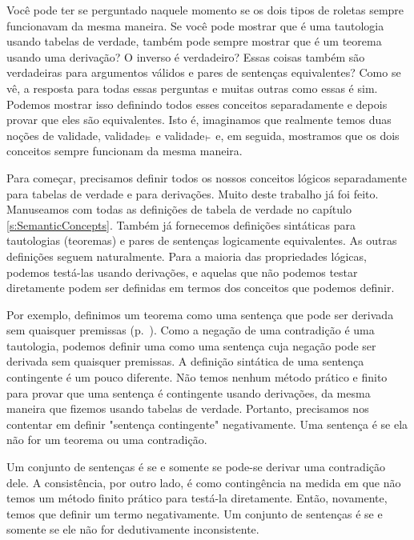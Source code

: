 Voc\^e pode ter se perguntado naquele momento se os dois tipos de roletas sempre funcionavam da mesma maneira. Se voc\^e pode mostrar que  \'e uma tautologia usando tabelas de verdade, tamb\'em pode sempre mostrar que \'e um teorema usando uma deriva\c c\~ao? O inverso \'e verdadeiro? Essas coisas tamb\'em s\~ao verdadeiras para argumentos v\'alidos e pares de senten\c cas equivalentes? Como se v\^e, a resposta para todas essas perguntas e muitas outras como essas \'e sim. Podemos mostrar isso definindo todos esses conceitos separadamente e depois provar que eles s\~ao equivalentes.  Isto \'e, imaginamos que realmente temos duas no\c c\~oes de validade, validade$_{\vDash}$ e validade$_{\vdash}$ e, em seguida, mostramos que os dois conceitos sempre funcionam da mesma maneira.


Para come\c car, precisamos definir todos os nossos conceitos l\'ogicos separadamente para tabelas de verdade e  para deriva\c c\~oes. Muito deste trabalho j\'a foi feito.  Manuseamos com todas as defini\c c\~oes de tabela de verdade no cap\'itulo \ref{s:SemanticConcepts}. Tamb\'em j\'a fornecemos defini\c c\~oes sint\'aticas para tautologias (teoremas) e pares de senten\c cas logicamente equivalentes. As outras defini\c c\~oes seguem naturalmente. Para a maioria das propriedades l\'ogicas, podemos test\'a-las usando deriva\c c\~oes, e aquelas que n\~ao podemos testar diretamente podem ser definidas em termos dos conceitos que podemos definir.

Por exemplo, definimos um teorema como uma senten\c ca que pode ser derivada sem quaisquer premissas (p.~\pageref{def:syntactic_tautology_in_sl}). Como a nega\c c\~ao de uma contradi\c c\~ao \'e uma tautologia, podemos definir uma  \label{def:syntactic_contradiction_in_sl} como uma senten\c ca cuja nega\c c\~ao pode ser derivada sem quaisquer premissas. A defini\c c\~ao sint\'atica de uma senten\c ca contingente \'e um pouco diferente. N\~ao temos nenhum m\'etodo pr\'atico e finito para provar que uma senten\c ca \'e contingente usando deriva\c c\~oes, da mesma maneira que fizemos usando tabelas de verdade. Portanto, precisamos nos contentar em definir "senten\c ca contingente" negativamente. Uma senten\c ca \'e  \label{def:syntactically_contingent_in_sl} se ela  n\~ao for um teorema ou uma contradi\c c\~ao. 
 

Um  conjunto de senten\c cas \'e  \label{def:syntactically_inconsistent_ in_sl}  se e somente se pode-se derivar uma contradi\c c\~ao dele. A consist\^encia, por outro lado, \'e como conting\^encia na medida em que n\~ao temos um m\'etodo finito pr\'atico para test\'a-la diretamente. Ent\~ao, novamente, temos que definir um termo negativamente. Um  conjunto de senten\c cas \'e  \label{def:syntactically consistent in SL} se e somente se ele n\~ao for dedutivamente inconsistente.
    
